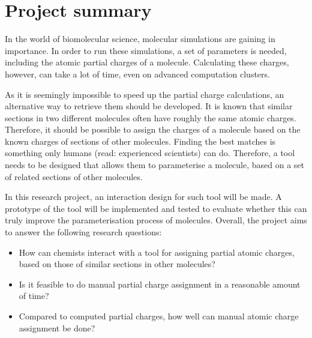 \chapter{Project summary}

In the world of biomolecular science, molecular simulations are gaining in importance. In order to run these simulations, a set of parameters is needed, including the atomic partial charges of a molecule. Calculating these charges, however, can take a lot of time, even on advanced computation clusters.

As it is seemingly impossible to speed up the partial charge calculations, an alternative way to retrieve them should be developed. It is known that similar sections in two different molecules often have roughly the same atomic charges. Therefore, it should be possible to assign the charges of a molecule based on the known charges of sections of other molecules. Finding the best matches is something only humans (read: experienced scientists) can do. Therefore, a tool needs to be designed that allows them to parameterise a molecule, based on a set of related sections of other molecules. 

In this research project, an interaction design for such tool will be made. A prototype of the tool will be implemented and tested to evaluate whether this can truly improve the parameterisation process of molecules. Overall, the project aims to answer the following research questions:
\begin{itemize}
\item How can chemists interact with a tool for assigning partial atomic charges, based on those of similar sections in other molecules?
\item Is it feasible to do manual partial charge assignment in a reasonable amount of time?
\item Compared to computed partial charges, how well can manual atomic charge assignment be done?
\end{itemize}
